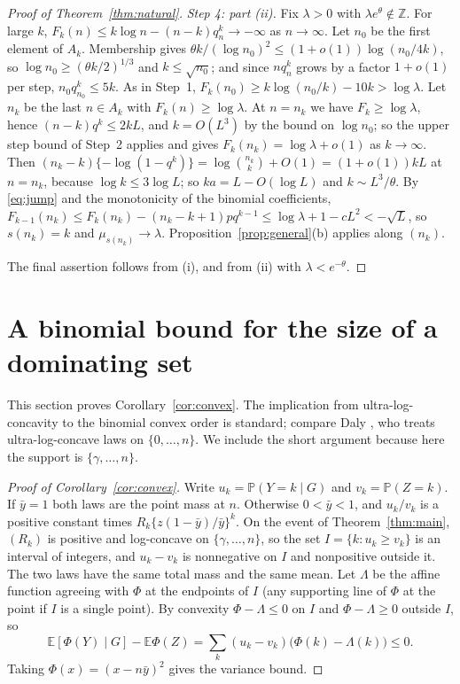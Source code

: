 \documentclass[11pt]{article}
\theoremstyle{remark}
\newcommand{\E}{\mathbb E}
\newcommand{\PP}{\mathbb P}
\begin{document}
\begin{proof}[Proof of Theorem~\ref{thm:natural}]
\emph{Step 4: part (ii).} Fix $\lambda>0$ with $\lambda e^\theta\notin\mathbb Z$. For large $k$, $F_k(n)\le k\log n-(n-k)q_n^k\to-\infty$ as $n\to\infty$. Let $n_0$ be the first element of $A_k$. Membership gives $\theta k/(\log n_0)^2\le(1+o(1))\log(n_0/4k)$, so $\log n_0\ge(\theta k/2)^{1/3}$ and $k\le\sqrt{n_0}$; and since $nq_n^k$ grows by a factor $1+o(1)$ per step, $n_0q_{n_0}^k\le5k$. As in Step~1, $F_k(n_0)\ge k\log(n_0/k)-10k>\log\lambda$. Let $n_k$ be the last $n\in A_k$ with $F_k(n)\ge\log\lambda$. At $n=n_k$ we have $F_k\ge\log\lambda$, hence $(n-k)q^k\le2kL$, and $k=O(L^3)$ by the bound on $\log n_0$; so the upper step bound of Step~2 applies and gives $F_k(n_k)=\log\lambda+o(1)$ as $k\to\infty$. Then $(n_k-k)\{-\log(1-q^k)\}=\log\binom{n_k}k+O(1)=(1+o(1))kL$ at $n=n_k$, because $\log k\le3\log L$; so $ka=L-O(\log L)$ and $k\sim L^3/\theta$. By \eqref{eq:jump} and the monotonicity of the binomial coefficients, $F_{k-1}(n_k)\le F_k(n_k)-(n_k-k+1)pq^{k-1}\le\log\lambda+1-cL^2<-\sqrt L$, so $s(n_k)=k$ and $\mu_{s(n_k)}\to\lambda$. Proposition~\ref{prop:general}(b) applies along $(n_k)$.

The final assertion follows from (i), and from (ii) with $\lambda<e^{-\theta}$.
\end{proof}

\section{A binomial bound for the size of a dominating set}\label{sec:convex}
This section proves Corollary~\ref{cor:convex}. The implication from ultra-log-concavity to the binomial convex order is standard; compare Daly \cite[Theorem~4.2]{Daly}, who treats ultra-log-concave laws on $\{0,\dots,n\}$. We include the short argument because here the support is $\{\gamma,\dots,n\}$.

\begin{proof}[Proof of Corollary~\ref{cor:convex}]
Write $u_k=\PP(Y=k\mid G)$ and $v_k=\PP(Z=k)$. If $\bar y=1$ both laws are the point mass at $n$. Otherwise $0<\bar y<1$, and $u_k/v_k$ is a positive constant times $R_k\{z(1-\bar y)/\bar y\}^k$. On the event of Theorem~\ref{thm:main}, $(R_k)$ is positive and log-concave on $\{\gamma,\dots,n\}$, so the set $I=\{k:u_k\ge v_k\}$ is an interval of integers, and $u_k-v_k$ is nonnegative on $I$ and nonpositive outside it. The two laws have the same total mass and the same mean. Let $\Lambda$ be the affine function agreeing with $\Phi$ at the endpoints of $I$ (any supporting line of $\Phi$ at the point if $I$ is a single point). By convexity $\Phi-\Lambda\le0$ on $I$ and $\Phi-\Lambda\ge0$ outside $I$, so
\[
 \E[\Phi(Y)\mid G]-\E\Phi(Z)=\sum_k(u_k-v_k)\big(\Phi(k)-\Lambda(k)\big)\le0 .
\]
Taking $\Phi(x)=(x-n\bar y)^2$ gives the variance bound.
\end{proof}
\end{document}
